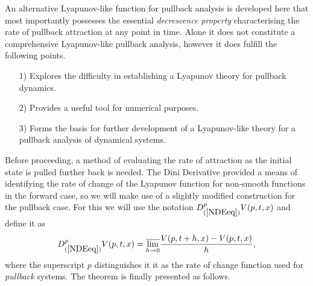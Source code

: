 An alternative Lyapunov-like function for pullback analysis is developed here
that most importantly possesses the essential \textit{decrescence property}
characterising the rate of pullback attraction at any point in time. Alone
it does not constitute a comprehensive Lyapunov-like pullback analysis,
however it does fulfill the following points.
\begin{itemize}
  \item [1)] Explores the difficulty in establishing a Lyapunov theory
for pullback dynamics.
  \item [2)] Provides a useful tool for numerical purposes.
  \item [3)] Forms the basis for further development of a Lyapunov-like
theory for a pullback analysis of dynamical systems.
\end{itemize}

Before proceeding, a method of evaluating the rate of attraction as the
initial state is pulled further back is needed. The Dini
Derivative provided a means of identifying the rate of change of
the Lyapunov function for non-smooth functions in the forward
case, so we will make use of a slightly modified construction for
the pullback case. For this we will use the notation
$D^{p}_{(\ref{NDEeq})}V(p, t, x)$ and define it as
\[ D^p_{(\ref{NDEeq})}V(p, t, x) = \overline{\lim_{h \to 0}} \frac{V(p,
  t+h, x) - V(p, t, x)}{h}, \]
where the superscript $p$ distinguishes it it as the rate of change function used for \textit{pullback} systems. The theorem is finally presented as follows.

